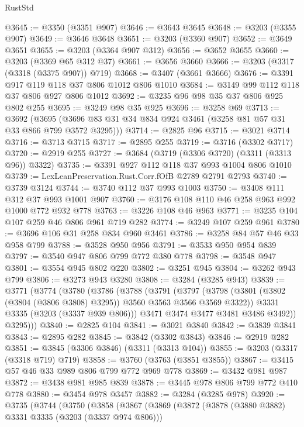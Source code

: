 \begin{lexlean}{RustStd}
\begin{coremodule}
@3645 := @3350 (@3351 @907)
@3646 := @3643 @3645
@3648 := @3203 (@3355 @907)
@3649 := @3646 @3648
@3651 := @3203 (@3360 @907)
@3652 := @3649 @3651
@3655 := @3203 (@3364 @907 @312)
@3656 := @3652 @3655
@3660 := @3203 (@3369 @65 @312 @37)
@3661 := @3656 @3660
@3666 := @3203 (@3317 (@3318 (@3375 @907)) @719)
@3668 := @3407 (@3661 @3666)
@3676 := @3391 @917 @119 @118 @37 @806 @1012 @806 @1010
@3684 := @3149 @99 @112 @118 @37 @806 @927 @806 @1012
@3692 := @3235 @96 @98 @35 @37 @806 @925 @802 @255
@3695 := @3249 @98 @35 @925
@3696 := @3258 @69
@3713 := @3692
    (@3695 (@3696 @83 @31 @34 @834 @924 @3461 (@3258 @81 @57 @31 @33 @866 @799 @3572 @3295)))
@3714 := @2825 @96
@3715 := @3021 @3714
@3716 := @3713 @3715
@3717 := @2895 @255
@3719 := @3716 (@3302 @3717)
@3720 := @2919 @255
@3727 := @3684 (@3719 (@3306 @3720) (@3311 (@3313 @96)) @3322)
@3735 := @3391 @927 @112 @118 @37 @993 @1004 @806 @1010
@3739 := LexLeanPreservation.Rust.Corr.fOfB @2789 @2791 @2793
@3740 := @3739 @3124
@3744 := @3740 @112 @37 @993 @1003
@3750 := @3408 @111 @312 @37 @993 @1001 @907
@3760 := @3176 @108 @110 @46 @258 @963 @992 @1000 @772 @932 @778
@3763 := @3226 @108 @46 @963
@3771 := @3235 @104 @107 @259 @46 @806 @961 @719 @282
@3774 := @3249 @107 @259 @961
@3780 := @3696 @106 @31 @258 @834 @960 @3461
@3786 := @3258 @84 @57 @46 @33 @958 @799
@3788 := @3528 @950 @956
@3791 := @3533 @950 @954 @839
@3797 := @3540 @947 @806 @799 @772 @380 @778
@3798 := @3548 @947
@3801 := @3554 @945 @802 @220
@3802 := @3251 @945
@3804 := @3262 @943 @799
@3806 := @3273 @943 @3280
@3808 := @3284 (@3285 @943)
@3839 := @3771
    (@3774
      (@3780
        (@3786
          (@3788
            (@3791
              (@3797
                (@3798 (@3801 (@3802 (@3804 (@3806 @3808) @3295)) @3560 @3563 @3566 @3569 @3322))
                @3331
                @3335
                (@3203 (@3337 @939 @806)))
              @3471
              @3474
              @3477
              @3481
              @3486
              @3492))
          @3295)))
@3840 := @2825 @104
@3841 := @3021 @3840
@3842 := @3839 @3841
@3843 := @2895 @282
@3845 := @3842 (@3302 @3843)
@3846 := @2919 @282
@3851 := @3845 (@3306 @3846) (@3311 (@3313 @104))
@3855 := @3203 (@3317 (@3318 @719) @719)
@3858 := @3760 (@3763 (@3851 @3855))
@3867 := @3415 @57 @46 @33 @989 @806 @799 @772 @969 @778
@3869 := @3432 @981 @987
@3872 := @3438 @981 @985 @839
@3878 := @3445 @978 @806 @799 @772 @410 @778
@3880 := @3454 @978 @3457
@3882 := @3284 (@3285 @978)
@3920 := @3735
    (@3744
      (@3750
        (@3858
          (@3867
            (@3869
              (@3872
                (@3878 (@3880 @3882) @3331 @3335 (@3203 (@3337 @974 @806)))

\end{coremodule}
\end{lexlean}
